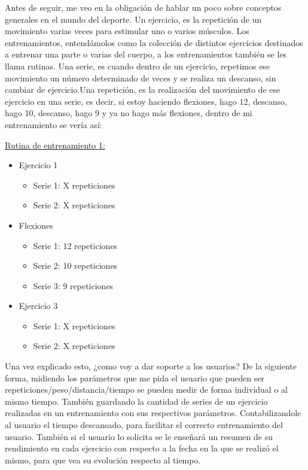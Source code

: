 Antes de seguir, me veo en la obligación de hablar un poco sobre conceptos generales en el mundo del deporte. Un ejercicio, es la repetición de un movimiento varias veces para estimular uno o varios músculos. Los entrenamientos, entendámolos como la colección de distintos ejercicios destinados a entrenar una parte o varias del cuerpo, a los entrenamientos también se les llama rutinas. Una serie, es cuando dentro de un ejercicio, repetimos ese movimiento un número determinado de veces y se realiza un descanso, sin cambiar de ejercicio.Una repetición, es la realización del movimiento de ese ejercicio en una serie, es decir, si estoy haciendo flexiones, hago 12, descanso, hago 10, descanso, hago 9 y ya no hago más flexiones, dentro de mi entrenamiento se vería así:

\underline {Rutina de entrenamiento 1:}
\begin{itemize}
	\item Ejercicio 1
	\begin{itemize}
		\item Serie 1: X repeticiones
		\item Serie 2: X repeticiones
	\end{itemize}
	\item Flexiones
	\begin{itemize}
		\item Serie 1: 12 repeticiones
		\item Serie 2: 10 repeticiones 
		\item Serie 3: 9 repeticiones
	\end{itemize}
	\item Ejercicio 3
	\begin{itemize}
		\item Serie 1: X repeticiones
		\item Serie 2: X repeticiones
	\end{itemize}
\end{itemize}

Una vez explicado esto, ¿como voy a dar soporte a los usuarios? De la siguiente forma, midiendo los parámetros que me pida el usuario que pueden ser repeticiones/peso/distancia/tiempo se pueden medir de forma individual o al mismo tiempo. También guardando la cantidad de series de un ejercicio realizadas en un entrenamiento con sus respectivos parámetros. Contabilizandole al usuario el tiempo descansado, para facilitar el correcto entrenamiento del usuario. También si el usuario lo solicita se le enseñará un resumen de su rendimiento en cada ejercicio con respecto a la fecha en la que se realizó el mismo, para que vea su evolución respecto al tiempo. 

